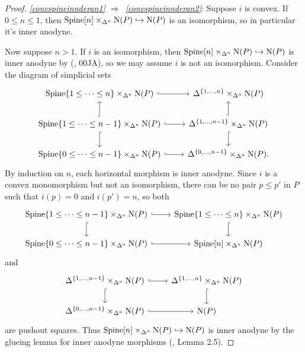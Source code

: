 \documentclass{tac}
\newcommand{\tx}[1]{\textnormal{#1}}
\begin{document}
\begin{proof} \emph{\ref{convspineinnderan1} $\Rightarrow$~\ref{convspineinnderan2}}: Suppose $i$ is convex.  If $0\leq n\leq 1$, then $\tx{Spine}[n] \times_{\Delta^n} \tx{N}(P) \hookrightarrow \tx{N}(P)$ is an isomorphism, so in particular it's inner anodyne.

Now suppose $n>1$. If $i$ is an isomorphism, then $ \tx{Spine}[n] \times_{\Delta^n} \tx{N}(P) \hookrightarrow \tx{N}(P)$ is inner anodyne by (\cite{kerodon}, 00JA), so we may assume $i$ is not an isomorphism.  Consider the diagram of simplicial sets
\[\begin{tikzcd}
 \tx{Spine}\{1\leq \dots \leq n \}\times_{\Delta^n} \tx{N}(P) \arrow[hook]{r} & \Delta^{\{1,\dots , n \}}\times_{\Delta^n} \tx{N}(P)  \\
 \tx{Spine}\{1\leq \dots \leq n-1 \}\times_{\Delta^n} \tx{N}(P) \arrow[hook]{r} \arrow[hook]{u} \arrow[hook]{d} & \Delta^{\{1,\dots , n-1 \}}\times_{\Delta^n} \tx{N}(P)  \arrow[hook]{u}  \arrow[hook]{d} \\
 \tx{Spine}\{0\leq \dots \leq n-1 \}\times_{\Delta^n} \tx{N}(P)  \arrow[hook]{r}& \Delta^{\{0,\dots , n-1 \}}\times_{\Delta^n} \tx{N}(P) . 
\end{tikzcd}\]
By induction on $n$, each horizontal morphism is inner anodyne.  Since $i$ is a convex monomorphism but not an isomorphism, there can be no pair $p\leq p'$ in $P$ such that $i(p)=0$ and $i(p')=n$, so both
\[\begin{tikzcd} \tx{Spine}\{1\leq \dots \leq n-1 \}\times_{\Delta^n} \tx{N}(P) \arrow[hook]{r}\arrow[hook]{d} & \tx{Spine}\{1\leq \dots \leq n \}\times_{\Delta^n} \tx{N}(P) \arrow[hook]{d} \\
 \tx{Spine}\{0\leq \dots \leq n-1 \}\times_{\Delta^n} \tx{N}(P)\arrow[hook]{r} & \tx{Spine}[n]  \times_{\Delta^n} \tx{N}(P)\end{tikzcd} \]
and
\[\begin{tikzcd} \Delta^{\{1,\dots , n-1 \}}\times_{\Delta^n} \tx{N}(P) \arrow[hook]{r}\arrow[hook]{d}& \Delta^{\{1,\dots , n \}}\times_{\Delta^n} \tx{N}(P)\arrow[hook]{d} \\
 \Delta^{\{0,\dots , n-1 \}}\times_{\Delta^n} \tx{N}(P)\arrow[hook]{r} & \tx{N}(P)\end{tikzcd} \]
are pushout squares.  Thus $\tx{Spine}[n] \times_{\Delta^n} \tx{N}(P) \hookrightarrow \tx{N}(P)$ is inner anodyne by the glueing lemma for inner anodyne morphisms (\cite{stevenson}, Lemma 2.5).

\hfill %


\end{proof}
\end{document}

